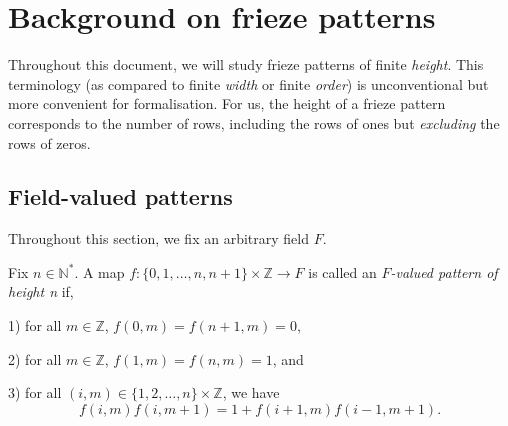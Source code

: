 \chapter{Background on frieze patterns}\label{s:fp}
Throughout this document, we will study frieze patterns of finite {\it height}. This terminology (as compared to finite {\it width} or 
finite {\it order}) is unconventional but more convenient for formalisation. For us, the height of a frieze pattern corresponds 
to the number of rows, including the rows of ones but {\it excluding} the rows of zeros.
\section{Field-valued patterns}
Throughout this section, we fix an arbitrary field $F$. 


\begin{definition}
    \label{def:pattern_n}
        Fix $n \in \mathbb{N}^*$. A map $f : \{0,1,\ldots , n,n+1\} \times \mathbb{Z} \longrightarrow F$ is called
        an \textit{$F$-valued pattern of height n} if, 
        
        1) for all $m \in \mathbb{Z}$, $ f(0,m) = f (n+1,m) = 0$, 
        
        2) for all $m \in \mathbb{Z}$, $ f(1,m) = f (n,m) = 1$, and 
        
        3) for all $(i,m) \in \{1,2,\ldots , n\} \times \mathbb{Z}$, we have
        \begin{equation}\label{eq:diamond}
            f(i,m) f(i,m+1) = 1 + f(i+1,m) f(i-1, m+1).
        \end{equation}
    \end{definition}

